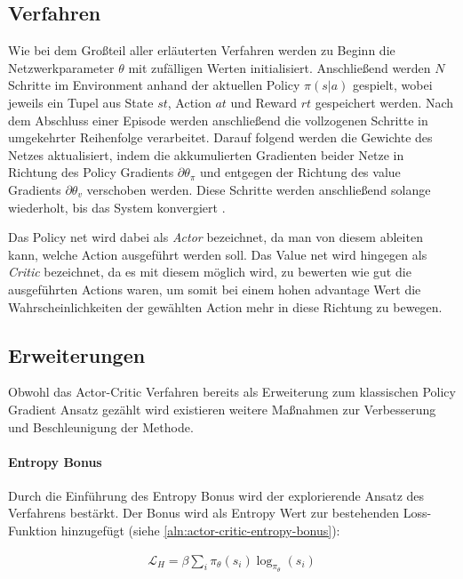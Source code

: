 \documentclass[11pt]{scrartcl}
\begin{document}
\subsection{Verfahren}
Wie bei dem Großteil aller erläuterten Verfahren werden zu Beginn die Netzwerkparameter $\theta$ mit
zufälligen Werten initialisiert. Anschließend werden $N$ Schritte im Environment anhand der aktuellen
Policy $\pi(s|a)$ gespielt, wobei jeweils ein Tupel aus State $st$, Action $at$ und Reward $rt$
gespeichert werden. Nach dem Abschluss einer Episode werden anschließend die vollzogenen Schritte in
umgekehrter Reihenfolge verarbeitet. Darauf folgend werden die Gewichte des Netzes aktualisiert, indem
die akkumulierten Gradienten beider Netze in Richtung des Policy Gradients $\partial\theta_\pi$
und entgegen der Richtung des value Gradients $\partial\theta_v$ verschoben werden. Diese Schritte
werden anschließend solange wiederholt, bis das System konvergiert \cite[~S.268 f.]{L2018}.

Das Policy net wird dabei als \textit{Actor} bezeichnet, da man von diesem ableiten kann, welche
Action ausgeführt werden soll. Das Value net wird hingegen als \textit{Critic} bezeichnet, da es mit
diesem möglich wird, zu bewerten wie gut die ausgeführten Actions waren, um somit bei einem hohen
advantage Wert die Wahrscheinlichkeiten der gewählten Action mehr in diese Richtung zu bewegen.

\subsection{Erweiterungen}
Obwohl das Actor-Critic Verfahren bereits als Erweiterung zum klassischen Policy Gradient Ansatz
gezählt wird existieren weitere Maßnahmen zur Verbesserung und Beschleunigung der Methode.

\paragraph*{Entropy Bonus} 
\noindent
\newline
Durch die Einführung des Entropy Bonus wird der explorierende Ansatz des Verfahrens bestärkt.
Der Bonus wird als Entropy Wert zur bestehenden Loss-Funktion hinzugefügt (siehe
\ref{aln:actor-critic-entropy-bonus}):

\begin{align}
\mathcal{L}_H=\beta\sum_i\pi_\theta(s_i)\log_{\pi_\theta}(s_i)
\label{aln:actor-critic-entropy-bonus}
\end{align}
\end{document}
